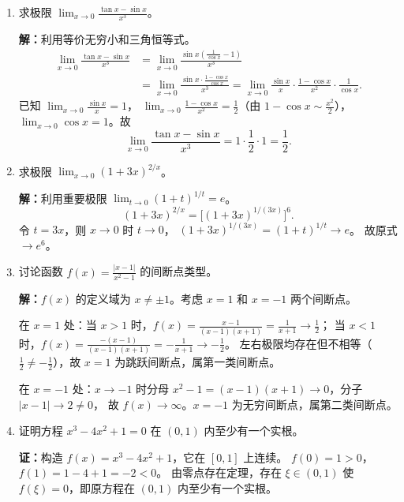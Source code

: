 \documentclass[12pt,a4paper]{ctexart}
\begin{document}
\begin{enumerate}[leftmargin=*,label=\arabic*.,start=4]
  \item 求极限 $\displaystyle\lim_{x\to 0}\frac{\tan x - \sin x}{x^3}$。

    \textbf{解：}利用等价无穷小和三角恒等式。
    \begin{align*}
      \lim_{x\to 0}\frac{\tan x - \sin x}{x^3}
      &= \lim_{x\to 0}\frac{\sin x(\frac{1}{\cos x} - 1)}{x^3} \\
      &= \lim_{x\to 0}\frac{\sin x \cdot \frac{1-\cos x}{\cos x}}{x^3}
       = \lim_{x\to 0}\frac{\sin x}{x} \cdot \frac{1-\cos x}{x^2} \cdot \frac{1}{\cos x}.
    \end{align*}
    已知 $\lim_{x\to 0}\frac{\sin x}{x} = 1$，
    $\lim_{x\to 0}\frac{1-\cos x}{x^2} = \frac{1}{2}$（由 $1-\cos x \sim \frac{x^2}{2}$），
    $\lim_{x\to 0}\cos x = 1$。故
    \[
    \lim_{x\to 0}\frac{\tan x - \sin x}{x^3} = 1 \cdot \frac{1}{2} \cdot 1 = \frac{1}{2}.
    \]

  \item 求极限 $\displaystyle\lim_{x\to 0}(1+3x)^{2/x}$。

    \textbf{解：}利用重要极限 $\lim_{t\to 0}(1+t)^{1/t} = e$。
    \[
    (1+3x)^{2/x} = \bigl[(1+3x)^{1/(3x)}\bigr]^{6}.
    \]
    令 $t = 3x$，则 $x\to 0$ 时 $t\to 0$，
    $(1+3x)^{1/(3x)} = (1+t)^{1/t} \to e$。
    故原式 $\to e^6$。

  \item 讨论函数 $f(x) = \frac{|x-1|}{x^2-1}$ 的间断点类型。

    \textbf{解：}$f(x)$ 的定义域为 $x \neq \pm 1$。考虑 $x=1$ 和 $x=-1$ 两个间断点。

    在 $x=1$ 处：当 $x>1$ 时，$f(x) = \frac{x-1}{(x-1)(x+1)} = \frac{1}{x+1} \to \frac{1}{2}$；
    当 $x<1$ 时，$f(x) = \frac{-(x-1)}{(x-1)(x+1)} = -\frac{1}{x+1} \to -\frac{1}{2}$。
    左右极限均存在但不相等（$\frac{1}{2} \neq -\frac{1}{2}$），故 $x=1$ 为跳跃间断点，属第一类间断点。

    在 $x=-1$ 处：$x\to -1$ 时分母 $x^2-1 = (x-1)(x+1) \to 0$，分子 $|x-1| \to 2 \neq 0$，
    故 $f(x) \to \infty$。$x=-1$ 为无穷间断点，属第二类间断点。

  \item 证明方程 $x^3 - 4x^2 + 1 = 0$ 在 $(0,1)$ 内至少有一个实根。

    \textbf{证：}构造 $f(x) = x^3 - 4x^2 + 1$，它在 $[0,1]$ 上连续。
    $f(0) = 1 > 0$，$f(1) = 1 - 4 + 1 = -2 < 0$。
    由零点存在定理，存在 $\xi \in (0,1)$ 使 $f(\xi) = 0$，即原方程在 $(0,1)$ 内至少有一个实根。
\end{enumerate}
\end{document}
